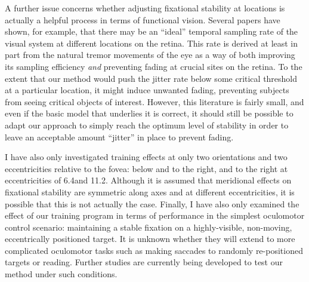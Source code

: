 A further issue concerns whether adjusting fixational stability at locations is actually a helpful process in terms of functional vision. Several papers have shown, for example, that there may be an ``ideal'' temporal sampling rate of the visual system at different locations on the retina\citep{deruaz_2004, watson_2012}. This rate is derived at least in part from the natural tremor movements of the eye as a way of both improving its sampling efficiency \textit{and} preventing fading at crucial sites on the retina. To the extent that our method would push the jitter rate below some critical threshold at a particular location, it might induce unwanted fading, preventing subjects from seeing critical objects of interest. However, this literature is fairly small, and even if the basic model that underlies it is correct, it should still be possible to adapt our approach to simply reach the optimum level of stability in order to leave an acceptable amount ``jitter'' in place to prevent fading.

I have also only investigated training effects at only two orientations and two eccentricities relative to the fovea: below and to the right, and to the right at eccentricities of 6.4\degree and 11.2\degree. Although it is assumed that meridional effects on fixational stability are symmetric along axes and at different eccentricities, it is possible that this is not actually the case. Finally, I have also only examined the effect of our training program in terms of performance in the simplest oculomotor control scenario: maintaining a stable fixation on a highly-visible, non-moving, eccentrically positioned target. It is unknown whether they will extend to more complicated oculomotor tasks such as making saccades to randomly re-positioned targets or reading. Further studies are currently being developed to test our method under such conditions.

